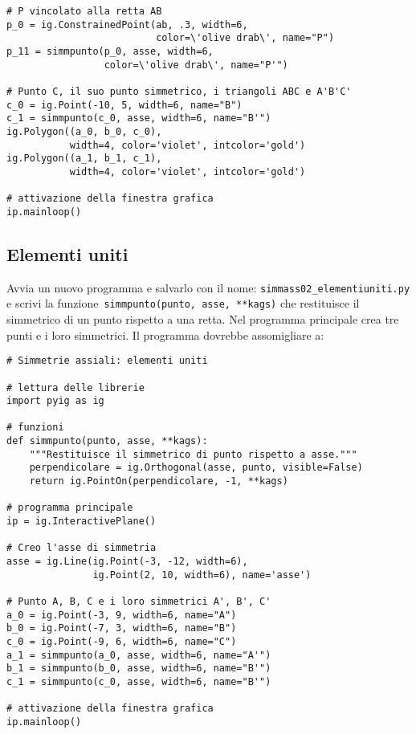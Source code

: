 \begin{itemize} [noitemsep]
\begin{lstlisting}
# P vincolato alla retta AB
p_0 = ig.ConstrainedPoint(ab, .3, width=6, 
                          color=\'olive drab\', name="P")
p_11 = simmpunto(p_0, asse, width=6, 
                 color=\'olive drab\', name="P'")

# Punto C, il suo punto simmetrico, i triangoli ABC e A'B'C'
c_0 = ig.Point(-10, 5, width=6, name="B")
c_1 = simmpunto(c_0, asse, width=6, name="B'")
ig.Polygon((a_0, b_0, c_0), 
           width=4, color='violet', intcolor='gold')
ig.Polygon((a_1, b_1, c_1), 
           width=4, color='violet', intcolor='gold')

# attivazione della finestra grafica
ip.mainloop()
\end{lstlisting}

\end{itemize}


\subsection{Elementi uniti}

Avvia un nuovo programma e salvarlo con il nome: 
\lstinline{simmass02_elementiuniti.py}
e scrivi la funzione~\lstinline{simmpunto(punto, asse, **kags)} che restituisce 
il simmetrico di un punto rispetto a una retta.
Nel programma principale crea tre punti e i loro simmetrici.
Il programma dovrebbe assomigliare a:

\begin{lstlisting}
# Simmetrie assiali: elementi uniti

# lettura delle librerie
import pyig as ig

# funzioni
def simmpunto(punto, asse, **kags):
    """Restituisce il simmetrico di punto rispetto a asse."""
    perpendicolare = ig.Orthogonal(asse, punto, visible=False)
    return ig.PointOn(perpendicolare, -1, **kags)

# programma principale
ip = ig.InteractivePlane()

# Creo l'asse di simmetria
asse = ig.Line(ig.Point(-3, -12, width=6),
               ig.Point(2, 10, width=6), name='asse')

# Punto A, B, C e i loro simmetrici A', B', C'
a_0 = ig.Point(-3, 9, width=6, name="A")
b_0 = ig.Point(-7, 3, width=6, name="B")
c_0 = ig.Point(-9, 6, width=6, name="C")
a_1 = simmpunto(a_0, asse, width=6, name="A'")
b_1 = simmpunto(b_0, asse, width=6, name="B'")
c_1 = simmpunto(c_0, asse, width=6, name="B'")

# attivazione della finestra grafica
ip.mainloop()
\end{lstlisting}

